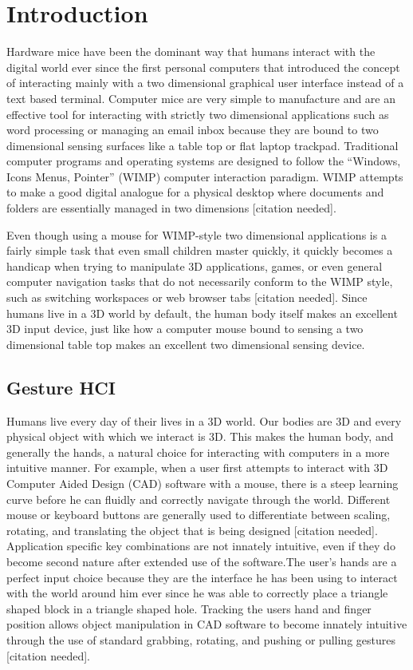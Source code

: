 \chapter{Introduction}
Hardware mice have been the dominant way that humans interact with the digital world ever since the first personal computers that introduced the concept of interacting mainly with a two dimensional graphical user interface instead of a text based terminal. Computer mice are very simple to manufacture and are an effective tool for interacting with strictly two dimensional applications such as word processing or managing an email inbox because they are bound to two dimensional sensing surfaces like a table top or flat laptop trackpad. Traditional computer programs and operating systems are designed to follow the “Windows, Icons Menus, Pointer” (WIMP) computer interaction paradigm. WIMP attempts to make a good digital analogue for a physical desktop where documents and folders are essentially managed in two dimensions [citation needed].

Even though using a mouse for WIMP-style two dimensional applications is a fairly simple task that even small children master quickly, it quickly becomes a handicap when trying to manipulate 3D applications, games, or even general computer navigation tasks that do not necessarily conform to the WIMP style, such as switching workspaces or web browser tabs [citation needed]. Since humans live in a 3D world by default, the human body itself makes an excellent 3D input device, just like how a computer mouse bound to sensing a two dimensional table top makes an excellent two dimensional sensing device.

\section{Gesture HCI}

Humans live every day of their lives in a 3D world. Our bodies are 3D and every physical object with which we interact is 3D. This makes the human body, and generally the hands, a natural choice for interacting with computers in a more intuitive manner. For example, when a user first attempts to interact with 3D Computer Aided Design (CAD) software with a mouse, there is a steep learning curve before he can fluidly and correctly navigate through the world. Different mouse or keyboard buttons are generally used to differentiate between scaling, rotating, and translating the object that is being designed [citation needed]. Application specific key combinations are not innately intuitive, even if they do become second nature after extended use of the software.The user’s hands are a perfect input choice because they are the interface he has been using to interact with the world around him ever since he was able to correctly place a triangle shaped block in a triangle shaped hole. Tracking the users hand and finger position allows object manipulation in CAD software to become innately intuitive through the use of standard grabbing, rotating, and pushing or pulling gestures [citation needed].

